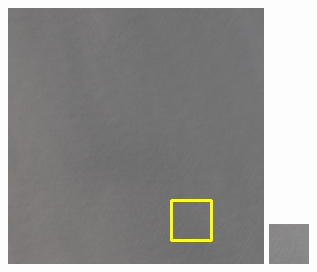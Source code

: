 \documentclass[10pt,UTF8,fntef]{ctexart}
\begin{document}
\begin{figure}[H]
{{\begin{minipage}[b]{0.15\linewidth}
            \includegraphics[width=1\linewidth]{../log/spoon3/cut/LC81321192014054LGN00_03249_color.jpg}\vspace{4pt}        
            \includegraphics[width=1\linewidth]{../log/spoon3/cut/tmp_cut_LC81321192014054LGN00_03249_color.jpg}\vspace{4pt}

\end{minipage}}}
\end{figure}
\end{document}
